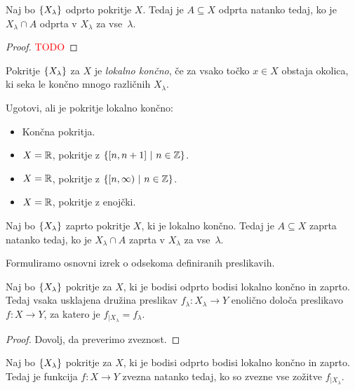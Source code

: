\begin{lema}
    Naj bo $\left\{X_\lambda\right\}$ odprto pokritje $X$. Tedaj je $A \subseteq X$ odprta natanko tedaj, ko je $X_\lambda \cap A$ odprta v $X_\lambda$ za vse~$\lambda$.
\end{lema}

\begin{proof}
    \textcolor{red}{TODO}
\end{proof}

\begin{definicija}
    Pokritje $\left\{X_\lambda\right\}$ za $X$ je \emph{lokalno končno}, če za vsako točko $x \in X$ obstaja okolica, ki seka le končno mnogo različnih $X_\lambda$.
\end{definicija}

\begin{primer}
    Ugotovi, ali je pokritje lokalno končno:
    \begin{itemize}
        \item Končna pokritja.
        \item $X = \mathbb{R}$, pokritje z $\left\{[n, n+1] \ | \ n \in \mathbb{Z}\right\}$.
        \item $X = \mathbb{R}$, pokritje z $\left\{[n, \infty) \ | \ n \in \mathbb{Z}\right\}$.
        \item $X = \mathbb{R}$, pokritje z enojčki.
    \end{itemize}
\end{primer}

\begin{lema}
    Naj bo $\left\{X_\lambda\right\}$ zaprto pokritje $X$, ki je lokalno končno. Tedaj je $A \subseteq X$ zaprta natanko tedaj, ko je $X_\lambda \cap A$ zaprta v $X_\lambda$ za vse~$\lambda$.
\end{lema}

Formuliramo osnovni izrek o odsekoma definiranih preslikavih.
\begin{izrek}
    Naj bo $\left\{X_\lambda\right\}$ pokritje za $X$, ki je bodisi odprto bodisi lokalno končno in zaprto. Tedaj vsaka usklajena družina preslikav $f_\lambda: X_\lambda \to Y$ enolično določa preslikavo $f: X \to Y$, za katero je $f_{|X_\lambda} = f_\lambda$.
\end{izrek}

\begin{proof}
    Dovolj, da preverimo zveznost.
\end{proof}

\begin{posledica}
    Naj bo $\left\{X_\lambda\right\}$ pokritje za $X$, ki je bodisi odprto bodisi lokalno končno in zaprto. Tedaj je funkcija $f: X \to Y$ zvezna natanko tedaj, ko so zvezne vse zožitve $f_{|X_\lambda}$.
\end{posledica}

